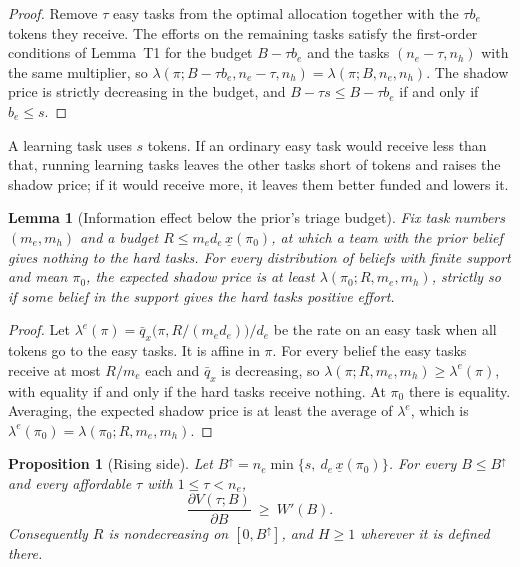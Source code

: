 \documentclass[11pt]{article}
\newtheorem{lemma}{Lemma}
\newtheorem{proposition}{Proposition}
\theoremstyle{definition}
\begin{document}
\begin{proof}
Remove $\tau$ easy tasks from the optimal allocation together with the $\tau b_e$ tokens they receive. The efforts on the remaining tasks satisfy the first-order conditions of Lemma~T1 for the budget $B-\tau b_e$ and the tasks $(n_e-\tau,n_h)$ with the same multiplier, so $\lambda(\pi;B-\tau b_e,n_e-\tau,n_h)=\lambda(\pi;B,n_e,n_h)$. The shadow price is strictly decreasing in the budget, and $B-\tau s\le B-\tau b_e$ if and only if $b_e\le s$.
\end{proof}

A learning task uses $s$ tokens. If an ordinary easy task would receive less than that, running learning tasks leaves the other tasks short of tokens and raises the shadow price; if it would receive more, it leaves them better funded and lowers it.

\begin{lemma}[Information effect below the prior's triage budget]\label{lem:info}
Fix task numbers $(m_e,m_h)$ and a budget $R\le m_ed_e\,\underline x(\pi_0)$, at which a team with the prior belief gives nothing to the hard tasks. For every distribution of beliefs with finite support and mean $\pi_0$, the expected shadow price is at least $\lambda(\pi_0;R,m_e,m_h)$, strictly so if some belief in the support gives the hard tasks positive effort.
\end{lemma}

\begin{proof}
Let $\lambda^e(\pi)=\bar q_x\bigl(\pi,R/(m_ed_e)\bigr)/d_e$ be the rate on an easy task when all tokens go to the easy tasks. It is affine in $\pi$. For every belief the easy tasks receive at most $R/m_e$ each and $\bar q_x$ is decreasing, so $\lambda(\pi;R,m_e,m_h)\ge\lambda^e(\pi)$, with equality if and only if the hard tasks receive nothing. At $\pi_0$ there is equality. Averaging, the expected shadow price is at least the average of $\lambda^e$, which is $\lambda^e(\pi_0)=\lambda(\pi_0;R,m_e,m_h)$.
\end{proof}

\begin{proposition}[Rising side]\label{prop:rise}
Let $B^{\uparrow}=n_e\min\{s,\ d_e\,\underline x(\pi_0)\}$. For every $B\le B^{\uparrow}$ and every affordable $\tau$ with $1\le\tau<n_e$,
\[
\frac{\partial V(\tau;B)}{\partial B}\ \ge\ W'(B).
\]
Consequently $R$ is nondecreasing on $[0,B^{\uparrow}]$, and $H\ge1$ wherever it is defined there.
\end{proposition}
\end{document}
